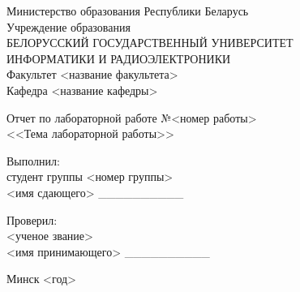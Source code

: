 \thispagestyle{empty}

\begin{center}
  Министерство образования Республики Беларусь \\
  \vspace{0.5ex}
  Учреждение образования \\
  БЕЛОРУССКИЙ ГОСУДАРСТВЕННЫЙ УНИВЕРСИТЕТ \\
  ИНФОРМАТИКИ И РАДИОЭЛЕКТРОНИКИ \\
  \vspace{0.5ex}
  Факультет <название факультета> \\
  \vspace{0.5ex}
  Кафедра <название кафедры>
\end{center}

\vspace{60mm}

\begin{center}
  Отчет по лабораторной работе №<номер работы> \\
  <<Тема лабораторной работы>>
\end{center}

\vspace{30mm}

\begin{flushleft}

Выполнил: \\
студент группы <номер группы> \\
<имя сдающего> \_\_\_\_\_\_\_\_\_\_

\vspace{0.5ex}

Проверил: \\
<ученое звание> \\
<имя принимающего> \_\_\_\_\_\_\_\_\_\_

\end{flushleft}

\vspace{45mm}
\begin{center}
  Минск <год>
\end{center}

\newpage
